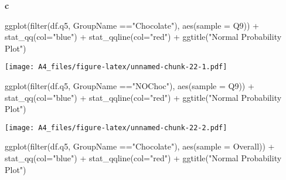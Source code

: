 \documentclass[
]{article}
\newenvironment{Shaded}{\begin{snugshade}}{\end{snugshade}}
\newcommand{\AttributeTok}[1]{\textcolor[rgb]{0.77,0.63,0.00}{#1}}
\newcommand{\FunctionTok}[1]{\textcolor[rgb]{0.00,0.00,0.00}{#1}}
\newcommand{\NormalTok}[1]{#1}
\newcommand{\SpecialCharTok}[1]{\textcolor[rgb]{0.00,0.00,0.00}{#1}}
\newcommand{\StringTok}[1]{\textcolor[rgb]{0.31,0.60,0.02}{#1}}
\begin{document}
\textbf{c}

\begin{Shaded}
\begin{Highlighting}[]
\FunctionTok{ggplot}\NormalTok{(}\FunctionTok{filter}\NormalTok{(df.q5, GroupName }\SpecialCharTok{==}\StringTok{"Chocolate"}\NormalTok{), }\FunctionTok{aes}\NormalTok{(}\AttributeTok{sample =}\NormalTok{ Q9)) }\SpecialCharTok{+} \FunctionTok{stat\_qq}\NormalTok{(}\AttributeTok{col=}\StringTok{"blue"}\NormalTok{) }\SpecialCharTok{+} \FunctionTok{stat\_qqline}\NormalTok{(}\AttributeTok{col=}\StringTok{"red"}\NormalTok{) }\SpecialCharTok{+} \FunctionTok{ggtitle}\NormalTok{(}\StringTok{"Normal Probability Plot"}\NormalTok{)}
\end{Highlighting}
\end{Shaded}

\texttt{[image: A4\_files/figure-latex/unnamed-chunk-22-1.pdf]}

\begin{Shaded}
\begin{Highlighting}[]
\FunctionTok{ggplot}\NormalTok{(}\FunctionTok{filter}\NormalTok{(df.q5, GroupName }\SpecialCharTok{==}\StringTok{"NOChoc"}\NormalTok{), }\FunctionTok{aes}\NormalTok{(}\AttributeTok{sample =}\NormalTok{ Q9)) }\SpecialCharTok{+} \FunctionTok{stat\_qq}\NormalTok{(}\AttributeTok{col=}\StringTok{"blue"}\NormalTok{) }\SpecialCharTok{+} \FunctionTok{stat\_qqline}\NormalTok{(}\AttributeTok{col=}\StringTok{"red"}\NormalTok{) }\SpecialCharTok{+} \FunctionTok{ggtitle}\NormalTok{(}\StringTok{"Normal Probability Plot"}\NormalTok{)}
\end{Highlighting}
\end{Shaded}

\texttt{[image: A4\_files/figure-latex/unnamed-chunk-22-2.pdf]}

\begin{Shaded}
\begin{Highlighting}[]
\FunctionTok{ggplot}\NormalTok{(}\FunctionTok{filter}\NormalTok{(df.q5, GroupName }\SpecialCharTok{==}\StringTok{"Chocolate"}\NormalTok{), }\FunctionTok{aes}\NormalTok{(}\AttributeTok{sample =}\NormalTok{ Overall)) }\SpecialCharTok{+} \FunctionTok{stat\_qq}\NormalTok{(}\AttributeTok{col=}\StringTok{"blue"}\NormalTok{) }\SpecialCharTok{+} \FunctionTok{stat\_qqline}\NormalTok{(}\AttributeTok{col=}\StringTok{"red"}\NormalTok{) }\SpecialCharTok{+} \FunctionTok{ggtitle}\NormalTok{(}\StringTok{"Normal Probability Plot"}\NormalTok{)}
\end{Highlighting}
\end{Shaded}
\end{document}

